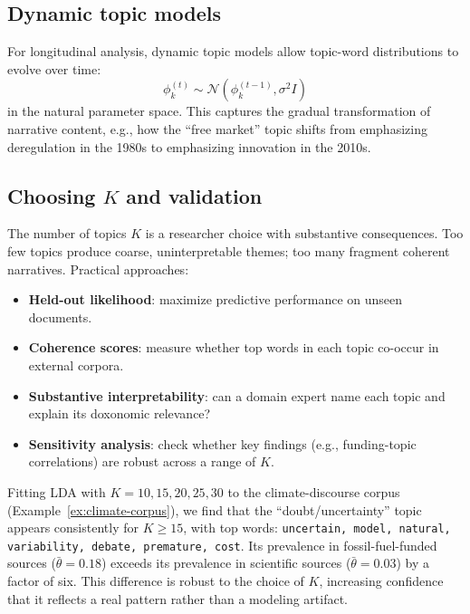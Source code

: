 \subsection{Dynamic topic models}

For longitudinal analysis, dynamic topic models \autocite{blei2006} allow topic-word distributions to evolve over time:
\[
  \phi_k^{(t)} \sim \mathcal{N}(\phi_k^{(t-1)}, \sigma^2 I)
\]
in the natural parameter space.
This captures the gradual transformation of narrative content, e.g., how the ``free market'' topic shifts from emphasizing deregulation in the 1980s to emphasizing innovation in the 2010s.

\subsection{Choosing $K$ and validation}

The number of topics $K$ is a researcher choice with substantive consequences.
Too few topics produce coarse, uninterpretable themes; too many fragment coherent narratives.
Practical approaches:
\begin{itemize}[nosep]
  \item \textbf{Held-out likelihood}: maximize predictive performance on unseen documents.
  \item \textbf{Coherence scores}: measure whether top words in each topic co-occur in external corpora.
  \item \textbf{Substantive interpretability}: can a domain expert name each topic and explain its doxonomic relevance?
  \item \textbf{Sensitivity analysis}: check whether key findings (e.g., funding-topic correlations) are robust across a range of $K$.
\end{itemize}

\begin{example}
\label{ex:topic-validation}
Fitting LDA with $K = 10, 15, 20, 25, 30$ to the climate-discourse corpus (Example~\ref{ex:climate-corpus}), we find that the ``doubt/uncertainty'' topic appears consistently for $K \geq 15$, with top words: \texttt{uncertain, model, natural, variability, debate, premature, cost}.
Its prevalence in fossil-fuel-funded sources ($\bar{\theta} = 0.18$) exceeds its prevalence in scientific sources ($\bar{\theta} = 0.03$) by a factor of six.
This difference is robust to the choice of $K$, increasing confidence that it reflects a real pattern rather than a modeling artifact.
\end{example}

